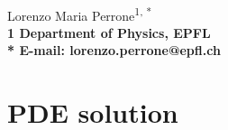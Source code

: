 \documentclass[11pt,letterpaper]{article}
\begin{document}
\vspace*{0.30in}

\begin{flushleft}
{\Large
\textbf{}
}
\newline
\\
Lorenzo Maria Perrone\textsuperscript{1, *}
\\
\bf{1} Department of Physics, EPFL
\\

% 
%





* E-mail: lorenzo.perrone@epfl.ch
\end{flushleft}

\section{PDE solution}
\end{document}
